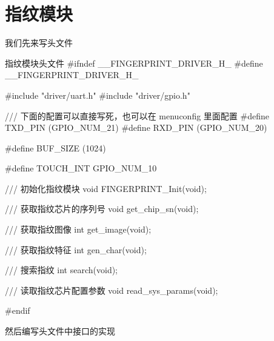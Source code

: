 \documentclass[lang=cn,newtx,10pt,scheme=chinese]{elegantbook}
\begin{document}
\section{指纹模块}

我们先来写头文件

\begin{mycode}{指纹模块头文件}
#ifndef __FINGERPRINT_DRIVER_H_
#define __FINGERPRINT_DRIVER_H_

#include "driver/uart.h"
#include "driver/gpio.h"

/// 下面的配置可以直接写死，也可以在 menuconfig 里面配置
#define TXD_PIN (GPIO_NUM_21)
#define RXD_PIN (GPIO_NUM_20)

#define BUF_SIZE (1024)

#define TOUCH_INT GPIO_NUM_10

/// 初始化指纹模块
void FINGERPRINT_Init(void);

/// 获取指纹芯片的序列号
void get_chip_sn(void);

/// 获取指纹图像
int get_image(void);

/// 获取指纹特征
int gen_char(void);

/// 搜索指纹
int search(void);

/// 读取指纹芯片配置参数
void read_sys_params(void);

#endif
\end{mycode}

然后编写头文件中接口的实现
\end{document}
